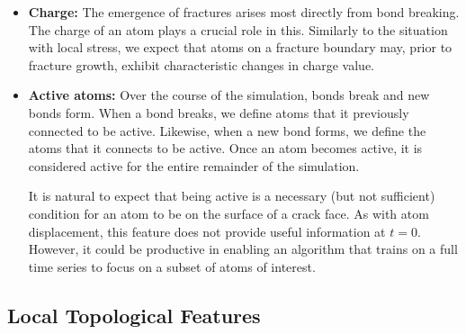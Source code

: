 \begin{itemize}
    \item\textbf{Charge:} The emergence of fractures arises most directly from bond breaking.  The charge of an atom plays a crucial role in this.  Similarly to the situation with local stress, we expect that atoms on a fracture boundary may, prior to fracture growth, exhibit characteristic changes in charge value.
    
    \item \textbf{Active atoms:} Over the course of the simulation, bonds break and new bonds form.  When a bond breaks, we define atoms that it previously connected to be active.  Likewise, when a new bond forms, we define the atoms that it connects to be active.  Once an atom becomes active, it is considered active for the entire remainder of the simulation.
    
    It is natural to expect that being active is a necessary (but not sufficient) condition for an atom to be on the surface of a crack face.  As with atom displacement, this feature does not provide useful information at $t=0$.  However, it could be productive in enabling an algorithm that trains on a full time series to focus on a subset of atoms of interest.

\end{itemize}

\subsection{Local Topological Features}


